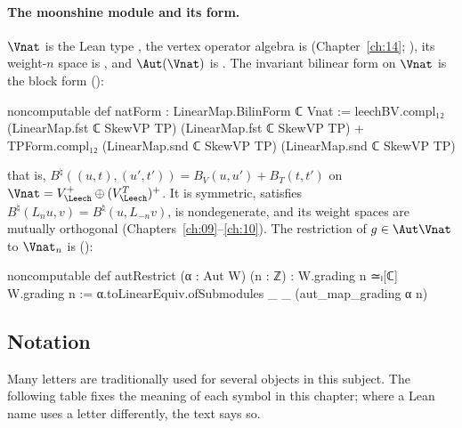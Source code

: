 \paragraph{The moonshine module and its form.}  $\Vnat$ is the Lean type , the vertex
operator algebra is  (Chapter~\ref{ch:14}; ), its
weight-$n$ space is , and $\Aut(\Vnat)$ is .  The
invariant bilinear form on $\Vnat$ is the block form 
():
\begin{leancode}
noncomputable def natForm : LinearMap.BilinForm ℂ Vnat :=
  leechBV.compl₁₂ (LinearMap.fst ℂ SkewVP TP) (LinearMap.fst ℂ SkewVP TP)
    + TPForm.compl₁₂ (LinearMap.snd ℂ SkewVP TP) (LinearMap.snd ℂ SkewVP TP)
\end{leancode}
that is, $B^\natural((u,t),(u',t'))=B_V(u,u')+B_T(t,t')$ on $\Vnat=V_\Leech^+\oplus(V_\Leech^T)^+$.  It is
symmetric, satisfies $B^\natural(L_nu,v)=B^\natural(u,L_{-n}v)$, is nondegenerate, and its weight
spaces are mutually orthogonal (Chapters~\ref{ch:09}--\ref{ch:10}).  The restriction of $g\in\Aut\Vnat$
to $\Vnat_n$ is  ():
\begin{leancode}
noncomputable def autRestrict (α : Aut W) (n : ℤ) : W.grading n ≃ₗ[ℂ] W.grading n :=
  α.toLinearEquiv.ofSubmodules _ _ (aut_map_grading α n)
\end{leancode}

\subsection{Notation}\label{ch18:sec:notation}

Many letters are traditionally used for several objects in this subject.  The following table fixes the meaning of
each symbol in this chapter; where a Lean name uses a letter differently, the text says so.

